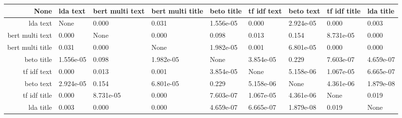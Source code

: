 \begin{tabular}{|r|l|l|l|l|l|l|l|l|}
  \hline
  None & lda text & bert multi text & bert multi title & beto title & tf idf text & beto text & tf idf title & lda title \\ 
  \hline
  lda text & None & 0.000 & 0.031 & 1.556e-05 & 0.000 & 2.924e-05 & 0.000 & 0.003 \\ 
  \hline
  bert multi text & 0.000 & None & 0.000 & 0.098 & 0.013 & 0.154 & 8.731e-05 & 0.000 \\ 
  \hline
  bert multi title & 0.031 & 0.000 & None & 1.982e-05 & 0.001 & 6.801e-05 & 0.000 & 0.000 \\ 
  \hline
  beto title & 1.556e-05 & 0.098 & 1.982e-05 & None & 3.854e-05 & 0.229 & 7.603e-07 & 4.659e-07 \\ 
  \hline
  tf idf text & 0.000 & 0.013 & 0.001 & 3.854e-05 & None & 5.158e-06 & 1.067e-05 & 6.665e-07 \\ 
  \hline
  beto text & 2.924e-05 & 0.154 & 6.801e-05 & 0.229 & 5.158e-06 & None & 4.361e-06 & 1.879e-08 \\ 
  \hline
  tf idf title & 0.000 & 8.731e-05 & 0.000 & 7.603e-07 & 1.067e-05 & 4.361e-06 & None & 0.019 \\ 
  \hline
  lda title & 0.003 & 0.000 & 0.000 & 4.659e-07 & 6.665e-07 & 1.879e-08 & 0.019 & None \\ 
  \hline
\end{tabular}
